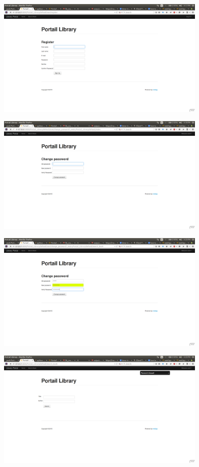 \documentclass{article}
\begin{document}
\begin{figure}[ht!]
\centering
\includegraphics[width=100mm]{9.png}
\caption{}
\end{figure}
\begin{figure}[ht!]
\centering
\includegraphics[width=100mm]{10.png}
\caption{}
\end{figure}
\begin{figure}[ht!]
\centering
\includegraphics[width=100mm]{11.png}
\caption{}
\end{figure}
\begin{figure}[ht!]
\centering
\includegraphics[width=100mm]{12.png}
\caption{}
\end{figure}
\newpage
\end{document}
